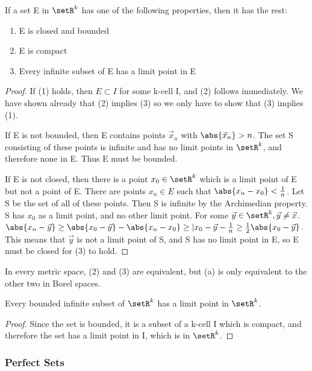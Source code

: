 \documentclass[12pt, letterpaper]{paper}
\begin{document}
\begin{theorem}
  \label{thr:2.41}
  If a set E in $\setR^k$ has one of the following properties, then it
  has the rest:
  \begin{enumerate}
  \item E is closed and bounded
  \item E is compact
  \item Every infinite subset of E has a limit point in E
  \end{enumerate}
\end{theorem}
\begin{proof}
  If (1) holds, then $E \subset I$ for some k-cell I, and (2) follows
  immediately. We have shown already that (2) implies (3) so we only
  have to show that (3) implies (1).

  If E is not bounded, then E contains points $\vec{x}_n$ with
  $\abs{\vec{x}_n} > n$. The set S consisting of these points is
  infinite and has no limit points in $\setR^k$, and therefore none in
  E. Thus E must be bounded.

  If E is not closed, then there is a point $x_0 \in \setR^k$ which is
  a limit point of E but not a point of E. There are points
  $x_n \in E$ such that $\abs{x_n - x_0} < \frac{1}{n}$. Let S be the
  set of all of these points. Then S is infinite by the Archimedian
  property. S has $x_0$ as a limit point, and no other limit
  point. For some $\vec{y} \in \setR^k, \vec{y} \neq \vec{x}$.
  $\abs{x_n - \vec{y}} \geq \abs{x_0 - \vec{y}} - \abs{x_n - x_0} \geq
  |x_0 - \vec{y} - \frac{1}{n} \geq \frac{1}{2} \abs{ x_0 -
    \vec{y}}$. This means that $\vec{y}$ is not a limit point of S,
  and S has no limit point in E, so E must be closed for (3) to hold.
\end{proof}

In every metric space, (2) and (3) are equivalent, but (a) is only
equivalent to the other two in Borel spaces.

\begin{theorem}[Weierstrass]
  \label{thr:2.42}
  Every bounded infinite subset of $\setR^k$ has a limit point in
  $\setR^k$.
\end{theorem}
\begin{proof}
  Since the set is bounded, it is a subset of a k-cell I which is
  compact, and therefore the set has a limit point in I, which is in
  $\setR^k$.
\end{proof}

\subsubsection{Perfect Sets}
\label{sec:org48b86f9}
\end{document}
